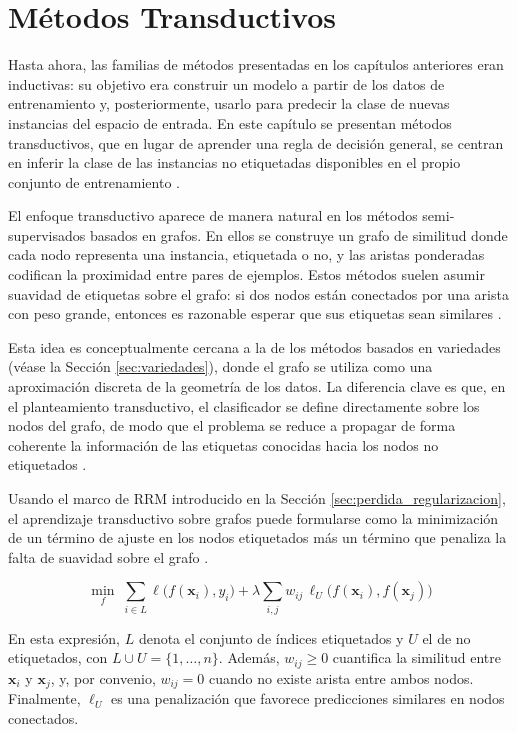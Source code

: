 \chapter{Métodos Transductivos}

Hasta ahora, las familias de métodos presentadas en los capítulos anteriores eran inductivas: su objetivo era construir un modelo a partir de los datos de entrenamiento y, posteriormente, usarlo para predecir la clase de nuevas instancias del espacio de entrada. En este capítulo se presentan métodos transductivos, que en lugar de aprender una regla de decisión general, se centran en inferir la clase de las instancias no etiquetadas disponibles en el propio conjunto de entrenamiento \cite{van2020survey}.

El enfoque transductivo aparece de manera natural en los métodos semi-supervisados basados en grafos. En ellos se construye un grafo de similitud donde cada nodo representa una instancia, etiquetada o no, y las aristas ponderadas codifican la proximidad entre pares de ejemplos. Estos métodos suelen asumir suavidad de etiquetas sobre el grafo: si dos nodos están conectados por una arista con peso grande, entonces es razonable esperar que sus etiquetas sean similares \cite{zhu2005semi}.

Esta idea es conceptualmente cercana a la de los métodos basados en variedades (véase la Sección \ref{sec:variedades}), donde el grafo se utiliza como una aproximación discreta de la geometría de los datos. La diferencia clave es que, en el planteamiento transductivo, el clasificador se define directamente sobre los nodos del grafo, de modo que el problema se reduce a propagar de forma coherente la información de las etiquetas conocidas hacia los nodos no etiquetados \cite{van2020survey}.

Usando el marco de \gls{RRM} introducido en la Sección \ref{sec:perdida_regularizacion}, el aprendizaje transductivo sobre grafos puede formularse como la minimización de un término de ajuste en los nodos etiquetados más un término que penaliza la falta de suavidad sobre el grafo \cite{van2020survey,zhu2005semi}.

\begin{equation}
    \label{eq:minimizacionGrafos}
    \min_{f} \; \sum_{i \in L} \ell\bigl(f(\mathbf{x}_i), y_i\bigr) + \lambda \sum_{i,j} w_{ij}\, \ell_U\bigl(f(\mathbf{x}_i), f(\mathbf{x}_j)\bigr)
\end{equation}

En esta expresión, $L$ denota el conjunto de índices etiquetados y $U$ el de no etiquetados, con $L\cup U=\{1,\dots,n\}$. Además, $w_{ij}\ge 0$ cuantifica la similitud entre $\mathbf{x}_i$ y $\mathbf{x}_j$, y, por convenio, $w_{ij}=0$ cuando no existe arista entre ambos nodos. Finalmente, $\ell_U$ es una penalización que favorece predicciones similares en nodos conectados.


